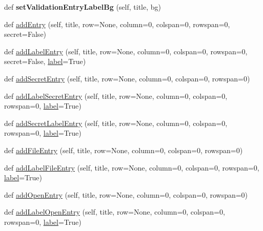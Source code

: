 \begin{DoxyCompactItemize}
\mbox{\label{class_python_01_g_u_i_1_1appjar_1_1gui_a805045da95c52b389a14b02723f15c0e}} 
def {\bfseries set\+Validation\+Entry\+Label\+Bg} (self, title, bg)
\item 
def \hyperlink{class_python_01_g_u_i_1_1appjar_1_1gui_ad3faf4a418564aa40e50ee28b569348d}{add\+Entry} (self, title, row=None, column=0, colspan=0, rowspan=0, secret=False)
\item 
def \hyperlink{class_python_01_g_u_i_1_1appjar_1_1gui_a3085fbd524cef94d4942578afbdb3ca2}{add\+Label\+Entry} (self, title, row=None, column=0, colspan=0, rowspan=0, secret=False, \hyperlink{class_python_01_g_u_i_1_1appjar_1_1gui_a899e593dca96dd2a31035558b685e3bd}{label}=True)
\item 
def \hyperlink{class_python_01_g_u_i_1_1appjar_1_1gui_a193ccdc1472134023a3dfd9fb9dcbdc9}{add\+Secret\+Entry} (self, title, row=None, column=0, colspan=0, rowspan=0)
\item 
def \hyperlink{class_python_01_g_u_i_1_1appjar_1_1gui_af440b0b3d702c7cef41e08b0620363d0}{add\+Label\+Secret\+Entry} (self, title, row=None, column=0, colspan=0, rowspan=0, \hyperlink{class_python_01_g_u_i_1_1appjar_1_1gui_a899e593dca96dd2a31035558b685e3bd}{label}=True)
\item 
def \hyperlink{class_python_01_g_u_i_1_1appjar_1_1gui_a1447e36595511819a7fa27294523f463}{add\+Secret\+Label\+Entry} (self, title, row=None, column=0, colspan=0, rowspan=0, \hyperlink{class_python_01_g_u_i_1_1appjar_1_1gui_a899e593dca96dd2a31035558b685e3bd}{label}=True)
\item 
def \hyperlink{class_python_01_g_u_i_1_1appjar_1_1gui_a4f9069cff2039494fd9c8d5432576c86}{add\+File\+Entry} (self, title, row=None, column=0, colspan=0, rowspan=0)
\item 
def \hyperlink{class_python_01_g_u_i_1_1appjar_1_1gui_a17b754ca524c253db8b281dd1a8f0b34}{add\+Label\+File\+Entry} (self, title, row=None, column=0, colspan=0, rowspan=0, \hyperlink{class_python_01_g_u_i_1_1appjar_1_1gui_a899e593dca96dd2a31035558b685e3bd}{label}=True)
\item 
def \hyperlink{class_python_01_g_u_i_1_1appjar_1_1gui_ab9cfd0b46585f9799c26748b92d82f47}{add\+Open\+Entry} (self, title, row=None, column=0, colspan=0, rowspan=0)
\item 
def \hyperlink{class_python_01_g_u_i_1_1appjar_1_1gui_a16812ec4acad39a305a966bdbb04fc87}{add\+Label\+Open\+Entry} (self, title, row=None, column=0, colspan=0, rowspan=0, \hyperlink{class_python_01_g_u_i_1_1appjar_1_1gui_a899e593dca96dd2a31035558b685e3bd}{label}=True)

\end{DoxyCompactItemize}
